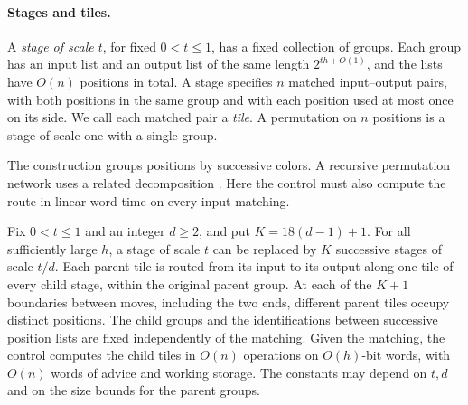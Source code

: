 \paragraph{Stages and tiles.}\label{app:two}
A \emph{stage of scale $t$}, for fixed $0<t\leq 1$, has a fixed collection
of groups.  Each group has an input list and an output list of the same
length $2^{th+O(1)}$, and the lists have $O(n)$ positions in total.  A
stage specifies $n$ matched input--output pairs, with both positions in
the same group and with each position used at most once on its side.
We call each matched pair a \emph{tile}.  A permutation on $n$ positions
is a stage of scale one with a single group.


The construction groups positions by successive colors. A recursive
permutation network uses a related decomposition \cite{Benes}. Here
the control must also compute the route in linear word time on every
input matching.

\par{}
\begin{lemma}\label{lem:subdivision}
Fix $0<t\leq 1$ and an integer $d\geq2$, and put $K=18(d-1)+1$.
For all sufficiently large $h$, a stage of scale $t$ can be replaced by
$K$ successive stages of scale $t/d$.  Each parent tile is routed from
its input to its output along one tile of every child stage, within the
original parent group.  At each of the $K+1$ boundaries between moves,
including the two ends, different parent tiles occupy distinct positions.
The child groups and the identifications between successive position
lists are fixed independently of the matching.  Given the matching, the
control computes the child tiles in $O(n)$ operations on $O(h)$-bit
words, with $O(n)$ words of advice and working storage.  The constants
may depend on $t,d$ and on the size bounds for the parent groups.
\end{lemma}

